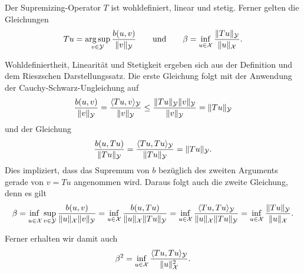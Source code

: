 \documentclass[../main.tex]{subfiles}
\begin{document}
\begin{Lemma}\label{lemma:supremizing_operator}
    Der Supremizing-Operator $T$ ist wohldefiniert, linear und stetig.
    Ferner gelten die Gleichungen
    \begin{equation}
        \label{eq:supremizing_operator_ist_argsup}
        Tu = \operatorname*{arg\,sup}_{v \in \mathcal Y} \frac{b(u, v)}{\lVert v\rVert_{\mathcal Y}}
        \qquad\text{und}\qquad
        \beta = \inf_{u \in \mathcal X} \frac{\lVert Tu\rVert_{\mathcal Y}}{\lVert u\rVert_{\mathcal X}}.
    \end{equation}

    \begin{Beweis}
        Wohldefiniertheit, Linearität und Stetigkeit ergeben sich aus der Definition und dem Rieszschen Darstellungssatz.
        Die erste Gleichung folgt mit der Anwendung der Cauchy-Schwarz-Ungleichung auf
        \begin{equation}
            \frac{b(u, v)}{\lVert v\rVert_{\mathcal Y}}
            = \frac{\langle Tu,v\rangle_{\mathcal Y}}{\lVert v\rVert_{\mathcal Y}}
            \leq \frac{\lVert Tu\rVert_{\mathcal Y} \lVert v\rVert_{\mathcal Y}}{\lVert v\rVert_{\mathcal Y}}
            = \lVert Tu\rVert_{\mathcal Y}
        \end{equation}
        und der Gleichung
        \begin{equation}
            \frac{b(u, Tu)}{\lVert Tu\rVert_{\mathcal Y}}
            = \frac{\langle Tu,Tu\rangle_{\mathcal Y}}{\lVert Tu\rVert_{\mathcal Y}}
            = \lVert Tu\rVert_{\mathcal Y}.
        \end{equation}
        Dies impliziert, dass das Supremum von $b$ bezüglich des zweiten Arguments gerade von $v = Tu$ angenommen wird.
        Daraus folgt auch die zweite Gleichung, denn es gilt
        \begin{equation}
            \beta
            = \infsup{u \in \mathcal X}{v \in \mathcal Y} \frac{b(u, v)}{\norm{u}_{\mathcal X} \norm{v}_{\mathcal Y}}
            = \inf_{u \in \mathcal X} \frac{b(u, Tu)}{\norm{u}_{\mathcal X} \norm{Tu}_{\mathcal Y}}
            = \inf_{u \in \mathcal X} \frac{\skp{Tu}{Tu}{\mathcal Y}}{\norm{u}_{\mathcal X}\norm{Tu}_{\mathcal Y}}
            = \inf_{u \in \mathcal X} \frac{\norm{Tu}_{\mathcal Y}}{\norm{u}_{\mathcal X}}.
        \end{equation}
    \end{Beweis}
\end{Lemma}
Ferner erhalten wir damit auch
\begin{equation}
    \beta^{2} = \inf_{u \in \mathcal X} \frac{\langle Tu,Tu\rangle_{\mathcal Y}}{\lVert u\rVert_{\mathcal X}^{2}}.
\end{equation}
\end{document}
